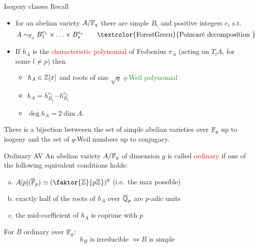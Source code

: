 \documentclass[usenames,dvipsnames]{beamer}
\newcommand{\red}[1]{\textcolor{red}{#1}}
\newcommand{\green}[1]{\textcolor{ForestGreen}{#1}}
\begin{document}
\begin{frame}{ Isogeny classes }
Recall
\begin{itemize}
 \item for an abelian variety $A/\mathbb{F}_q$ there are simple $B_i$ and positive integers $e_i$ s.t.
  \[ A \sim_{\F_q} B_1^{e_1}\times \ldots \times B_s^{e_s} \qquad\text{\green{Poincar\'e decomposition }}\] 
 \pause \item If $h_A$ is the \red{characteristic polynomial} of Frobenius $\pi_A$ (acting on $T_lA$, for some $l\neq p$) then
    \begin{itemize}
      \pause \item $h_A\in \mathbb{Z}[x]$ and roots of size $\sqrt{q}$ \qquad\green{$q$-Weil polynomial}
      \pause \item $ h_A = h_{B_1}^{e_1}\cdots h_{B_s}^{e_s} $
      \pause \item $\deg h_A = 2\dim A$.
    \end{itemize}
\end{itemize}
  \pause \begin{thm}
   There is a bijection betweeen the set of simple abelian varieties over $\mathbb{F}_q$ up to isogeny and the set of $q$-Weil numbers up to conjugacy.
  \end{thm}
\end{frame}

\begin{frame}{ Ordinary AV }
  An abelian variety $A/\mathbb{F}_q$ of dimension $g$ is called \red{ordinary} if one of the following equivalent conditions holds:
  \begin{enumerate}[(a)]
   \pause \item $A[p](\overline{\F}_p) \simeq \left(\faktor{\Z}{p\Z}\right)^g$ (i.e.~the max possible)
   \pause \item exactly half of the roots of $h_A$ over $\overline{\mathbb{Q}}_p$ are $p$-adic units
   \pause \item the mid-coefficient of $h_A$ is coprime with $p$
  \end{enumerate}
  \pause
  \begin{prop}
  For $B$ ordinary over $\mathbb{F}_q$:
   \[ h_B \text{ is irreducible } \Longleftrightarrow B \text{ is simple}\]
  \end{prop}
\end{frame}
\end{document}
